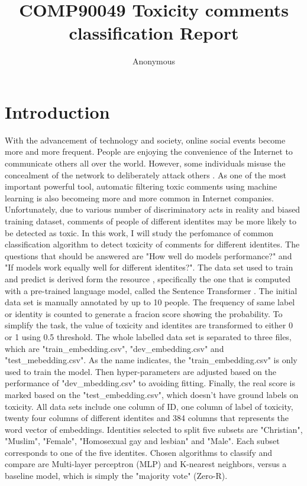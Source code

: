 \documentclass[11pt,twocolumn]{article}
\title{COMP90049 Toxicity comments classification Report}
\author
{Anonymous}
\begin{document}
\maketitle



\section{Introduction}
With the advancement of technology and society, online social events become more and more frequent. People are enjoying the convenience of the Internet to communicate others all over the world. 
However, some individuals misuse the concealment of the network to deliberately attack others \cite{ravi2019toxic}. As one of the most important powerful tool,
automatic filtering toxic comments using machine learning is also becomeing more and more common in Internet companies.
Unfortunately, due to various number of discriminatory acts in reality and biased training dataset, comments of people of different identites may be more likely to be detected as toxic.
In this work, I will study the perfomance of common classification algorithm to detect toxicity of comments for different identites. The questions that should be answered are "How well 
do models performance?" and "If models work equally well for different identites?".
\bigbreak
The data set used to train and predict is derived form the resource \cite{dataset}, specifically the one that is computed with a pre-trained language model, called the Sentence Transformer \cite{reimers2019sentencebert}.
The initial data set is manually annotated by up to 10 people. The frequency of same label or identity is counted to generate a fracion score showing the probability. To simplify the task, the value of toxicity and identites are 
transformed to either 0 or 1 using 0.5 threshold. The whole labelled data set is separated to three files, which are "train{\_}embedding.csv", "dev{\_}embedding.csv" and "test{\_}mebedding.csv". As the name indicates, the "train{\_}embedding.csv" 
is only used to train the model. Then hyper-parameters are adjusted based on the performance of "dev{\_}mbedding.csv" to avoiding fitting. Finally, the real score is marked based on the "test{\_}embedding.csv", 
which doesn't have ground labels on toxicity. All data sets include one column of ID, one column of label of toxicity, twenty four columns of different identites and 384 columns that represents the word vector of embeddings. 
Identities selected to split five subsets are "Christian", "Muslim", "Female", "Homosexual gay and lesbian" and "Male". Each subset corresponds to one of the five identites. 
\bigbreak
Chosen algorithms to classify and compare are Multi-layer perceptron (MLP) and K-nearest neighbors, versus a baseline model, which is simply the "majority vote" (Zero-R). 
\end{document}
